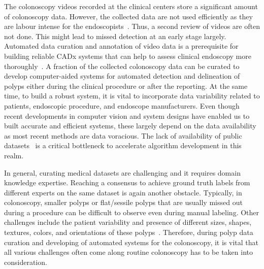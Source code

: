 \documentclass[journal]{IEEEtran}
\begin{document}
The colonoscopy videos recorded at the clinical centers store a significant amount of colonoscopy data. However, the collected data are not used efficiently as they are labour intense for the endoscopists~\cite{riegler2017eir}. Thus, a second review of videos are often not done. This might lead to missed detection at an early stage largely. 
Automated data curation and annotation of video data is a prerequisite for building reliable \ac{CADx} systems that can help to assess clinical endoscopy more thoroughly~\cite{de2018methodology}. A fraction of the collected colonoscopy data can be curated to develop computer-aided systems for automated detection and delineation of polyps either during the clinical procedure or after the reporting. At the same time, to build a robust system, it is vital to incorporate data variability related to patients, endoscopic procedure, and endoscope manufacturers. Even though recent developments in computer vision and system designs have enabled us to built accurate and efficient systems, these largely depend on the data availability as most recent methods are data voracious. The lack of availability of public datasets~\cite{shin2018abnormal} is a critical bottleneck to accelerate algorithm development in this realm.

In general, curating medical datasets are challenging and it requires domain knowledge expertise. Reaching a consensus to achieve ground truth labels from different experts on the same dataset is again another obstacle. Typically, in colonoscopy, smaller polyps or flat/sessile polyps that are usually missed out during a procedure can be difficult to observe even during manual labeling. Other challenges include the patient variability and presence of different sizes, shapes, textures, colors, and orientations of these polyps~\cite{jha2019resunet++}. Therefore, during polyp data curation and developing of automated systems for the colonoscopy, it is vital that all various challenges often come along routine colonoscopy has to be taken into consideration. 
\end{document}
